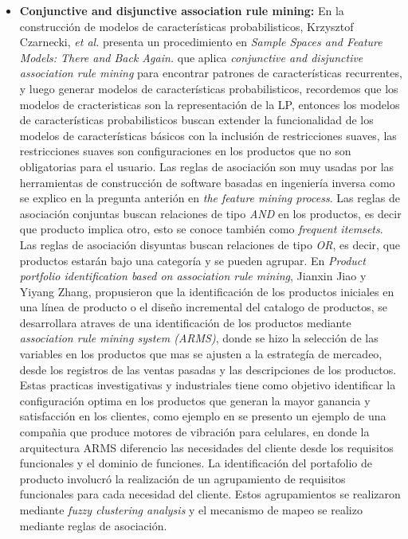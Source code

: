 \begin{itemize}
\item {\textbf{Conjunctive and disjunctive association rule mining:}}
En la construcción de modelos de características probabilisticos,  Krzysztof Czarnecki, \textit{et al.} presenta un procedimiento en \textit{Sample Spaces and Feature Models: There and Back Again.}\cite{Czarnecki2008} que aplica  \textit{conjunctive and disjunctive association rule mining} para encontrar patrones de características recurrentes, y luego generar modelos de características probabilisticos, recordemos que los modelos de cracteristicas son la representación de la LP, entonces los modelos de características probabilisticos buscan extender la funcionalidad de los modelos de características básicos con la inclusión de restricciones suaves, las restricciones suaves son configuraciones en los productos que no son obligatorias para el usuario. Las reglas de asociación son muy usadas por las herramientas de construcción de software basadas en ingeniería inversa como se explico en la pregunta anterión en \textit{the feature mining process}.
Las reglas de asociación conjuntas buscan relaciones de tipo \textit{AND} en los productos, es decir que producto implica otro, esto se conoce también como \textit{frequent itemsets}. Las reglas de asociación disyuntas buscan relaciones de tipo \textit{OR}, es decir, que productos estarán bajo una categoría y se pueden agrupar.
En \textit{Product portfolio identification based on association rule mining}, Jianxin Jiao y Yiyang Zhang\cite{Jiao2005}, propusieron que la identificación de los productos iniciales en una línea de producto o el diseño incremental del catalogo de productos, se desarrollara atraves de una identificación de los productos mediante \textit{association rule mining system (ARMS)}, donde se hizo la selección de las variables en los productos que mas se ajusten a la estrategía de mercadeo, desde los registros de las ventas pasadas y las descripciones de los productos. Estas practicas investigativas y industriales tiene como objetivo identificar la configuración optima en los productos que generan la mayor ganancia y satisfacción en los clientes, como ejemplo en \cite{Jiao2005} se presento un ejemplo de una compañia que produce motores de vibración para celulares, en donde la arquitectura ARMS diferencio las necesidades del cliente desde los requisitos funcionales y el dominio de funciones. La identificación del portafolio de producto involucró la realización de un agrupamiento de requisitos funcionales para cada necesidad del cliente. Estos agrupamientos se realizaron mediante \textit{fuzzy clustering analysis} y el mecanismo de mapeo se realizo mediante reglas de asociación.


\end{itemize}
